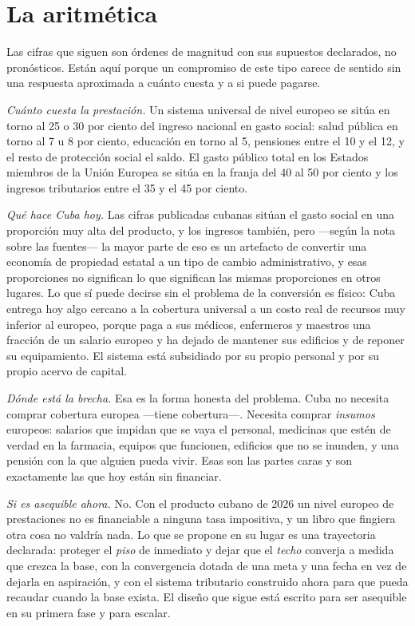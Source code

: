 \section{La aritmética}

Las cifras que siguen son órdenes de magnitud con sus supuestos declarados, no
pronósticos. Están aquí porque un compromiso de este tipo carece de sentido sin una
respuesta aproximada a cuánto cuesta y a si puede pagarse.

\emph{Cuánto cuesta la prestación.} Un sistema universal de nivel europeo se sitúa en
torno al 25 o 30 por ciento del ingreso nacional en gasto social: salud pública en
torno al 7 u 8 por ciento, educación en torno al 5, pensiones entre el 10 y el 12, y
el resto de protección social el saldo. El gasto público total en los Estados
miembros de la Unión Europea se sitúa en la franja del 40 al 50 por ciento y los
ingresos tributarios entre el 35 y el 45 por ciento.\unv{}

\emph{Qué hace Cuba hoy.} Las cifras publicadas cubanas sitúan el gasto social en una
proporción muy alta del producto, y los ingresos también, pero ---según la nota sobre
las fuentes--- la mayor parte de eso es un artefacto de convertir una economía de
propiedad estatal a un tipo de cambio administrativo, y esas proporciones no
significan lo que significan las mismas proporciones en otros lugares. Lo que sí puede
decirse sin el problema de la conversión es físico: Cuba entrega hoy algo cercano a la
cobertura universal a un costo real de recursos muy inferior al europeo, porque paga a
sus médicos, enfermeros y maestros una fracción de un salario europeo y ha dejado de
mantener sus edificios y de reponer su equipamiento. El sistema está subsidiado por su
propio personal y por su propio acervo de capital.

\emph{Dónde está la brecha.} Esa es la forma honesta del problema. Cuba no necesita
comprar cobertura europea ---tiene cobertura---. Necesita comprar \emph{insumos}
europeos: salarios que impidan que se vaya el personal, medicinas que estén de verdad
en la farmacia, equipos que funcionen, edificios que no se inunden, y una pensión con
la que alguien pueda vivir. Esas son las partes caras y son exactamente las que hoy
están sin financiar.

\emph{Si es asequible ahora.} No. Con el producto cubano de 2026 un nivel europeo de
prestaciones no es financiable a ninguna tasa impositiva, y un libro que fingiera otra
cosa no valdría nada. Lo que se propone en su lugar es una trayectoria declarada:
proteger el \emph{piso} de inmediato y dejar que el \emph{techo} converja a medida que
crezca la base, con la convergencia dotada de una meta y una fecha en vez de dejarla en
aspiración, y con el sistema tributario construido ahora para que pueda recaudar
cuando la base exista. El diseño que sigue está escrito para ser asequible en su
primera fase y para escalar.

